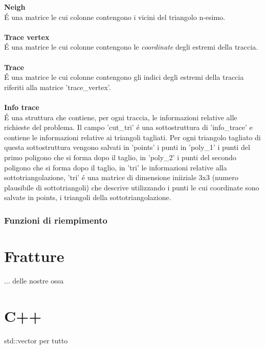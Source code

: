 \documentclass[11pt, a4paper]{article}
\begin{document}
\textbf{Neigh}\\
\'E una matrice le cui colonne contengono i vicini del triangolo n-esimo.\\\\
\textbf{Trace vertex}\\
\'E una matrice le cui colonne contengono le \textit{coordinate} degli estremi della traccia.\\\\
\textbf{Trace}\\
\'E una matrice le cui colonne contengono gli indici degli estremi della traccia riferiti alla matrice 'trace\_vertex'. \\\\
\textbf{Info trace}\\
\'E una struttura che contiene, per ogni traccia, le informazioni relative alle richieste del problema. Il campo 'cut\_tri' \'e una sottostruttura di 'info\_trace' e contiene le informazioni relative ai triangoli tagliati. Per ogni triangolo tagliato di questa sottostruttura vengono salvati in 'points' i punti in 'poly\_1' i punti del primo poligono che si forma dopo il taglio, in 'poly\_2' i punti del secondo poligono che si forma dopo il taglio, in 'tri' le informazioni relative alla sottotriangolazione, 'tri' \'e una matrice di dimensione iniiziale 3x3 (numero plausibile di sottotriangoli) che descrive utilizzando i punti le cui coordinate sono salvate in points, i triangoli della sottotriangolazione. \\
\subsubsection{\textbf{Funzioni di riempimento}}





\section{Fratture}
... delle nostre ossa


\section{C++}
std::vector per tutto
\end{document}
